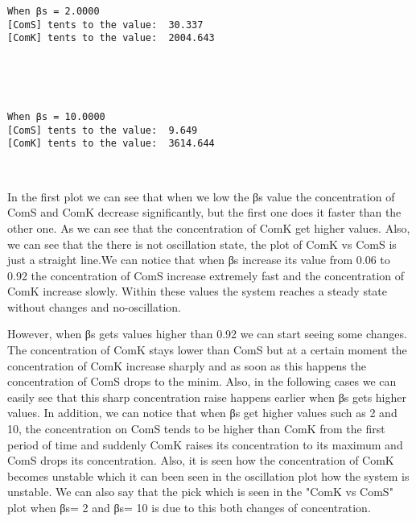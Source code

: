 \documentclass[11pt]{article}
\begin{document}
    \begin{Verbatim}[commandchars=\\\{\}]
When βs = 2.0000
[ComS] tents to the value:  30.337
[ComK] tents to the value:  2004.643

    \end{Verbatim}

    \begin{center}
    \end{center}
    { \hspace*{\fill} \\}
    
    \begin{center}
    \end{center}
    { \hspace*{\fill} \\}
    
    \begin{Verbatim}[commandchars=\\\{\}]
When βs = 10.0000
[ComS] tents to the value:  9.649
[ComK] tents to the value:  3614.644

    \end{Verbatim}

    \begin{center}
    \end{center}
    { \hspace*{\fill} \\}
    
    In the first plot we can see that when we low the βs value the
concentration of ComS and ComK decrease significantly, but the first one
does it faster than the other one. As we can see that the concentration
of ComK get higher values. Also, we can see that the there is not
oscillation state, the plot of ComK vs ComS is just a straight line.We
can notice that when βs increase its value from 0.06 to 0.92 the
concentration of ComS increase extremely fast and the concentration of
ComK increase slowly. Within these values the system reaches a steady
state without changes and no-oscillation.

However, when βs gets values higher than 0.92 we can start seeing some
changes. The concentration of ComK stays lower than ComS but at a
certain moment the concentration of ComK increase sharply and as soon as
this happens the concentration of ComS drops to the minim. Also, in the
following cases we can easily see that this sharp concentration raise
happens earlier when βs gets higher values. In addition, we can notice
that when βs get higher values such as 2 and 10, the concentration on
ComS tends to be higher than ComK from the first period of time and
suddenly ComK raises its concentration to its maximum and ComS drops its
concentration. Also, it is seen how the concentration of ComK becomes
unstable which it can been seen in the oscillation plot how the system
is unstable. We can also say that the pick which is seen in the "ComK vs
ComS" plot when βs= 2 and βs= 10 is due to this both changes of
concentration.


    
    
    
    
\end{document}
